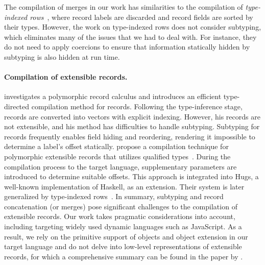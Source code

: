 The compilation of merges in our work has similarities to the compilation of
\emph{type-indexed rows}~\citep{shields2001type}, where record labels are
discarded and record fields are sorted by their types. However, the work on
type-indexed rows does not consider subtyping, which eliminates many of the
issues that we had to deal with. For instance, they do not need to apply
coercions to ensure that information statically hidden by subtyping is also
hidden at run time.

\paragraph{Compilation of extensible records.}
\citet{ohori1995polymorphic} investigates a polymorphic record calculus and
introduces an efficient type-directed compilation method for records. Following
the type-inference stage, records are converted into vectors with explicit
indexing. However, his records are not extensible, and his method has
difficulties to handle subtyping. Subtyping for records frequently enables field
hiding and reordering, rendering it impossible to determine a label's offset
statically. \citet{gaster1996polymorphic} propose a compilation technique for
polymorphic extensible records that utilizes qualified
types~\citep{jones1994theory}. During the compilation process to the target
language, supplementary parameters are introduced to determine suitable offsets.
This approach is integrated into Hugs, a well-known implementation of Haskell,
as an extension. Their system is later generalized by type-indexed
rows~\citep{shields2001type}. In summary, subtyping and record concatenation (or
merges) pose significant challenges to the compilation of extensible records.
Our work takes pragmatic considerations into account, including targeting widely
used dynamic languages such as JavaScript. As a result, we rely on the primitive
support of objects and object extension in our target language and do not delve
into low-level representations of extensible records, for which a comprehensive
summary can be found in the paper by \citet{leijen2005extensible}.

